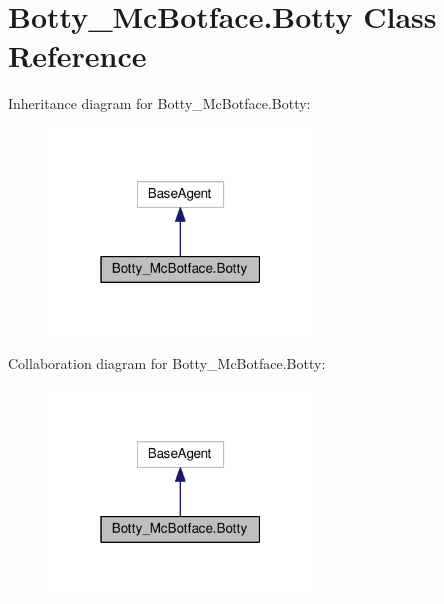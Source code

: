 \hypertarget{classBotty__McBotface_1_1Botty}{}\section{Botty\+\_\+\+Mc\+Botface.\+Botty Class Reference}
\label{classBotty__McBotface_1_1Botty}


Inheritance diagram for Botty\+\_\+\+Mc\+Botface.\+Botty\+:
\nopagebreak
\begin{figure}[H]
\begin{center}
\leavevmode
\includegraphics[width=199pt]{classBotty__McBotface_1_1Botty__inherit__graph}
\end{center}
\end{figure}


Collaboration diagram for Botty\+\_\+\+Mc\+Botface.\+Botty\+:
\nopagebreak
\begin{figure}[H]
\begin{center}
\leavevmode
\includegraphics[width=199pt]{classBotty__McBotface_1_1Botty__coll__graph}
\end{center}
\end{figure}

